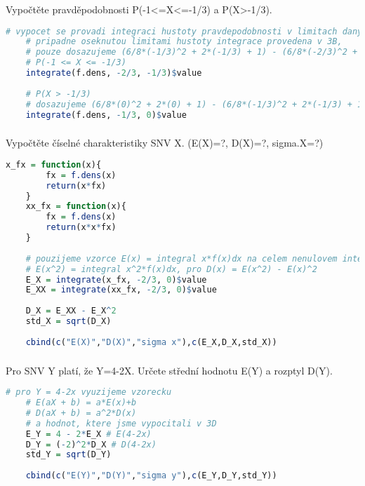 \documentclass{article}%
\begin{document}
\subsubsection{}
Vypočtěte pravděpodobnosti P(-1<=X<=-1/3) a P(X>-1/3). 
\begin{lstlisting}[language=R, showstringspaces=false, basicstyle=\small]
    # vypocet se provadi integraci hustoty pravdepodobnosti v limitach danych zadanim,
    # pripadne oseknutou limitami hustoty integrace provedena v 3B, 
    # pouze dosazujeme (6/8*(-1/3)^2 + 2*(-1/3) + 1) - (6/8*(-2/3)^2 + 2*(-2/3) + 1)
    # P(-1 <= X <= -1/3)
    integrate(f.dens, -2/3, -1/3)$value
    
    # P(X > -1/3)
    # dosazujeme (6/8*(0)^2 + 2*(0) + 1) - (6/8*(-1/3)^2 + 2*(-1/3) + 1)
    integrate(f.dens, -1/3, 0)$value 
\end{lstlisting}

\subsubsection{}
Vypočtěte číselné charakteristiky SNV X. (E(X)=?, D(X)=?, sigma.X=?) 
\begin{lstlisting}[language=R, showstringspaces=false, basicstyle=\small]
    x_fx = function(x){
        fx = f.dens(x)
        return(x*fx)
    } 
    xx_fx = function(x){
        fx = f.dens(x) 
        return(x*x*fx)
    } 
    
    # pouzijeme vzorce E(x) = integral x*f(x)dx na celem nenulovem intervalu
    # E(x^2) = integral x^2*f(x)dx, pro D(x) = E(x^2) - E(x)^2
    E_X = integrate(x_fx, -2/3, 0)$value
    E_XX = integrate(xx_fx, -2/3, 0)$value
    
    D_X = E_XX - E_X^2
    std_X = sqrt(D_X)
    
    cbind(c("E(X)","D(X)","sigma x"),c(E_X,D_X,std_X))
\end{lstlisting}

\subsubsection{}
Pro SNV Y platí, že Y=4-2X. Určete střední hodnotu E(Y) a rozptyl D(Y). 
\begin{lstlisting}[language=R, showstringspaces=false, basicstyle=\small]
    # pro Y = 4-2x vyuzijeme vzorecku
    # E(aX + b) = a*E(x)+b
    # D(aX + b) = a^2*D(x)
    # a hodnot, ktere jsme vypocitali v 3D
    E_Y = 4 - 2*E_X # E(4-2x)
    D_Y = (-2)^2*D_X # D(4-2x)
    std_Y = sqrt(D_Y)
    
    cbind(c("E(Y)","D(Y)","sigma y"),c(E_Y,D_Y,std_Y))
\end{lstlisting}
\end{document}
